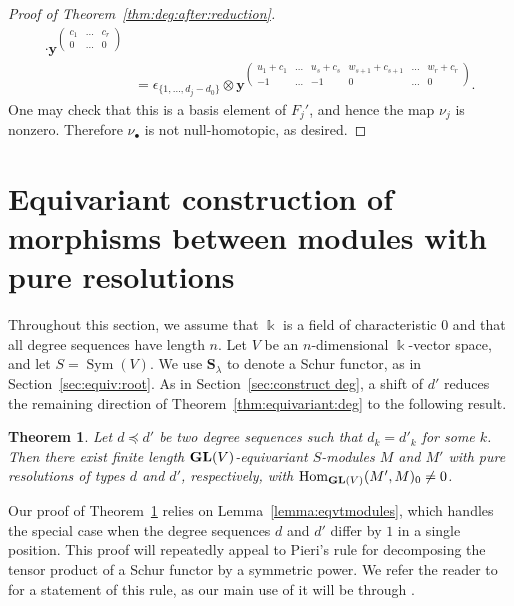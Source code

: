\documentclass[12pt]{amsart}
\newtheorem{theorem}[equation]{Theorem}
\theoremstyle{definition}
\newcommand{\Hom}{\operatorname{Hom}}
\newcommand{\Sc}{\mathbf{S}}
\newcommand{\GL}{{\bf GL}}
\newcommand{\Sym}{\operatorname{Sym}}
\begin{document}
\begin{proof}[Proof of Theorem~\ref{thm:deg:after:reduction}]
\begin{align*}
\cdot \mathbf{y}^{\left(\begin{smallmatrix}c_1& \dots& c_r\\ 0&\dots &0\end{smallmatrix}\right)}\\
&=
\epsilon_{\{1, \dots, d_j-d_0\}}\otimes 
\mathbf{y}^{\left(\begin{smallmatrix}u_1+c_1& \dots& u_s+c_s&w_{s+1}+c_{s+1}&\dots &w_r+c_r\\ -1&\dots&-1&0&\dots&0\end{smallmatrix}\right)}.
\end{align*}
One may check that this is a basis element of $F_j'$, and hence the
map $\nu_j$ is nonzero. Therefore $\nu_\bullet$ is not null-homotopic,
as desired.
\end{proof}

\section{Equivariant construction of morphisms between %
modules with pure resolutions}%
\label{sec:equiv:deg} 

Throughout this section, we assume that $\Bbbk$ is a field of
characteristic 0 and that all degree sequences have length $n$.  Let $V$ be
an $n$-dimensional $\Bbbk$-vector space, and let $S = \Sym(V)$.  We
use $\Sc_\lambda$ to denote a Schur functor, as in
Section~\ref{sec:equiv:root}. As in Section~\ref{sec:construct deg},
a shift of $d'$ reduces the remaining direction of
Theorem~\ref{thm:equivariant:deg} to the following result.
 
\begin{theorem} \label{theorem:eqvtmodules} Let $d \preceq d'$ be two
  degree sequences such that $d_k = d'_k$ for some $k$. Then there
  exist finite length  $\GL(V)$-equivariant $S$-modules $M$ and $M'$ 
  with pure resolutions of types $d$ and $d'$, respectively, with 
  $\Hom_{\GL(V)}(M',M)_0 \ne 0$.
\end{theorem}
Our proof of Theorem~\ref{theorem:eqvtmodules} relies on
Lemma~\ref{lemma:eqvtmodules}, which handles the special case when the
degree sequences $d$ and $d'$ differ by $1$ in a single position. This
proof will repeatedly appeal to Pieri's rule for decomposing the
tensor product of a Schur functor by a symmetric power. We refer the
reader to \cite[\S1.1 and Theorem 1.3]{sam} for a statement of this
rule, as our main use of it will be through \cite[Lemma 1.6]{sam}.
\end{document}
